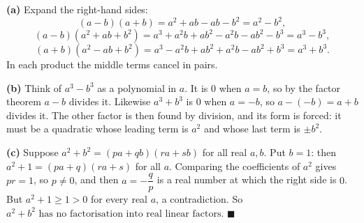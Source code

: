 \textbf{(a)} Expand the right-hand sides:
\[
(a-b)(a+b)=a^2+ab-ab-b^2=a^2-b^2,
\]
\[
(a-b)(a^2+ab+b^2)=a^3+a^2b+ab^2-a^2b-ab^2-b^3=a^3-b^3,
\]
\[
(a+b)(a^2-ab+b^2)=a^3-a^2b+ab^2+a^2b-ab^2+b^3=a^3+b^3 .
\]
In each product the middle terms cancel in pairs.

\textbf{(b)} Think of $a^3-b^3$ as a polynomial in $a$. It is $0$ when $a=b$, so by the factor theorem $a-b$ divides it. Likewise $a^3+b^3$ is $0$ when $a=-b$, so $a-(-b)=a+b$ divides it. The other factor is then found by division, and its form is forced: it must be a quadratic whose leading term is $a^2$ and whose last term is $\pm b^2$.

\textbf{(c)} Suppose $a^2+b^2=(pa+qb)(ra+sb)$ for all real $a,b$. Put $b=1$: then $a^2+1=(pa+q)(ra+s)$ for all $a$. Comparing the coefficients of $a^2$ gives $pr=1$, so $p\ne0$, and then $a=-\dfrac {q}{p}$ is a real number at which the right side is $0$. But $a^2+1\ge1>0$ for every real $a$, a contradiction. So $\boxed{a^2+b^2\text{ has no factorisation into real linear factors}}$. $\blacksquare$
